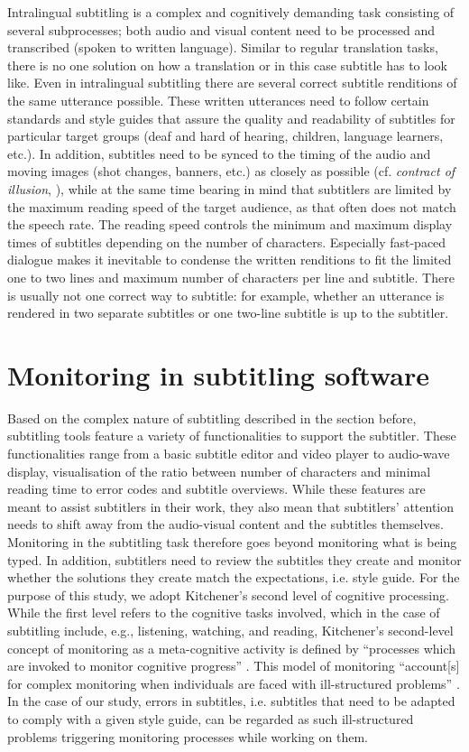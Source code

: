\documentclass[output=paper]{langscibook}
\begin{document}
Intralingual subtitling is a complex and cognitively demanding task consisting of several subprocesses; both audio and visual content need to be processed and transcribed (spoken to written language).
Similar to regular translation tasks, there is no one solution on how a translation or in this case subtitle has to look like.
Even in intralingual subtitling there are several correct subtitle renditions of the same utterance possible.
These written utterances need to follow certain standards and style guides that assure the quality and readability of subtitles for particular target groups (deaf and hard of hearing, children, language learners, etc.).
In addition, subtitles need to be synced to the timing of the audio and moving images (shot changes, banners, etc.) as closely as possible (cf. \textit{contract of illusion}, \citealt{pedersen2017far}), while at the same time bearing in mind that subtitlers are limited by the maximum reading speed of the target audience, as that often does not match the speech rate.
The reading speed controls the minimum and maximum display times of subtitles depending on the number of characters.
Especially fast-paced dialogue makes it inevitable to condense the written renditions to fit the limited one to two lines and maximum number of characters per line and subtitle.
There is usually not one correct way to subtitle: for example, whether an utterance is rendered in two separate subtitles or one two-line subtitle is up to the subtitler.

\section{Monitoring in subtitling software} 
Based on the complex nature of subtitling described in the section before, subtitling tools  feature a variety of functionalities to support the subtitler.
These functionalities range from a basic subtitle editor and video player to audio-wave display, visualisation of the ratio between number of characters and minimal reading time to error codes and subtitle overviews.
While these features are meant to assist subtitlers in their work, they also mean that subtitlers' attention needs to shift away from the audio-visual content and the subtitles themselves.
Monitoring in the subtitling task therefore goes beyond monitoring what is being typed.
In addition, subtitlers need to review the subtitles they create and monitor whether the solutions they create match the expectations, i.e. style guide.
For the purpose of this study, we adopt Kitchener's second level of cognitive processing.
While the first level refers to the cognitive tasks involved, which in the case of subtitling include, e.g., listening, watching, and reading, Kitchener's second-level concept of monitoring as a meta-cognitive activity is defined by “processes which are invoked to monitor cognitive progress” \citep[225]{kitchener1983cognition}.
This model of monitoring “account[s] for complex monitoring when individuals are faced with ill-structured problems” \citep[222]{kitchener1983cognition}.
In the case of our study, errors in subtitles, i.e. subtitles that need to be adapted to comply with a given style guide, can be regarded as such ill-structured problems triggering monitoring processes while working on them.
\end{document}
